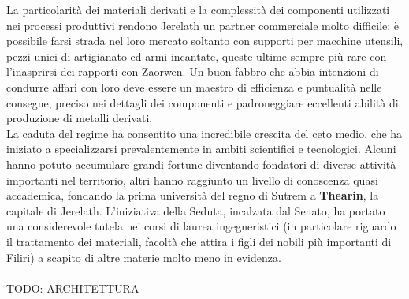 \documentclass[a4paper]{scrreprt}
\begin{document}
La particolarità dei materiali derivati e la complessità dei componenti utilizzati nei processi produttivi rendono Jerelath un partner commerciale molto difficile: è possibile farsi strada nel loro mercato soltanto con supporti per macchine utensili, pezzi unici di artigianato ed armi incantate, queste ultime sempre più rare con l'inasprirsi dei rapporti con Zaorwen. Un buon fabbro che abbia intenzioni di condurre affari con loro deve essere un maestro di efficienza e puntualità nelle consegne, preciso nei dettagli dei componenti e padroneggiare eccellenti abilità di produzione di metalli derivati.\\
La caduta del regime ha consentito una incredibile crescita del ceto medio, che ha iniziato a specializzarsi prevalentemente in ambiti scientifici e tecnologici. Alcuni hanno potuto accumulare grandi fortune diventando fondatori di diverse attività importanti nel territorio, altri hanno raggiunto un livello di conoscenza quasi accademica, fondando la prima università del regno di Sutrem a \textbf{Thearin}, la capitale di Jerelath. L'iniziativa della Seduta, incalzata dal Senato, ha portato una considerevole tutela nei corsi di laurea ingegneristici (in particolare riguardo il trattamento dei materiali, facoltà che attira i figli dei nobili più importanti di Filiri) a scapito di altre materie molto meno in evidenza.\\
\\

TODO: ARCHITETTURA\\
\end{document}

